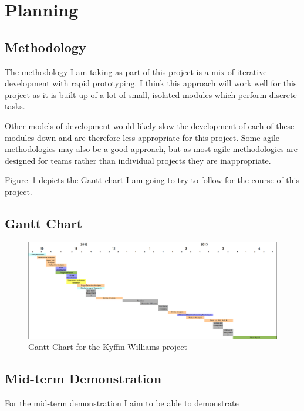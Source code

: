 \documentclass[11pt,fleqn,twoside]{article}
\begin{document}
\clearpage
\section{Planning}

\subsection{Methodology}
The methodology I am taking as part of this project is a mix of iterative development with rapid
prototyping. I think this approach will work well for this project as it is built up of a lot of 
small, isolated modules which perform discrete tasks.

Other models of development would likely slow the development of each of these modules down and are
therefore less appropriate for this project. Some agile methodologies may also be a good approach,
but as most agile methodologies are designed for teams rather than individual projects they are
inappropriate.

Figure~\ref{fig:gantt} depicts the Gantt chart I am going to try to follow for the course of this
project.


\clearpage
\newpage
\subsection{Gantt Chart}
\begin{figure}[H]
\includegraphics[scale=0.45, angle=90]{img/gantt.png}
\caption{Gantt Chart for the Kyffin Williams project}
\label{fig:gantt}
\end{figure}

\clearpage
\subsection{Mid-term Demonstration}
For the mid-term demonstration I aim to be able to demonstrate
\end{document}
